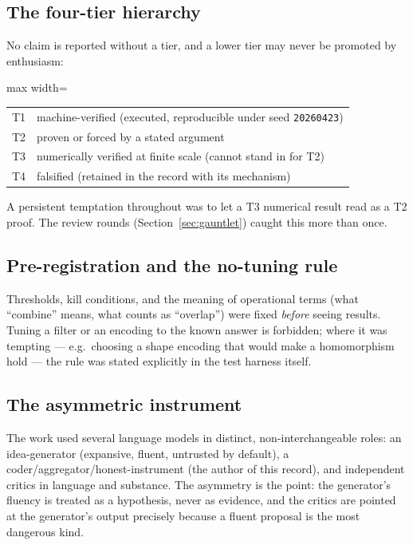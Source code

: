 \documentclass[11pt,a4paper]{article}
\newcommand{\seed}{\texttt{20260423}}
\newcommand{\TT}{\textsf{T1}}
\newcommand{\Tw}{\textsf{T2}}
\newcommand{\Th}{\textsf{T3}}
\newcommand{\Tf}{\textsf{T4}}
\theoremstyle{definition}
\theoremstyle{plain}
\begin{document}
\subsection{The four-tier hierarchy}
No claim is reported without a tier, and a lower tier may never be promoted by enthusiasm:
\begin{center}
\begin{adjustbox}{max width=\linewidth}\begin{tabular}{ll}
\toprule
\TT & machine-verified (executed, reproducible under seed \seed) \\
\Tw & proven or forced by a stated argument \\
\Th & numerically verified at finite scale (cannot stand in for \Tw) \\
\Tf & falsified (retained in the record with its mechanism) \\
\bottomrule
\end{tabular}\end{adjustbox}
\end{center}
A persistent temptation throughout was to let a \Th{} numerical result read as a \Tw{} proof. The
review rounds (Section~\ref{sec:gauntlet}) caught this more than once.

\subsection{Pre-registration and the no-tuning rule}
Thresholds, kill conditions, and the meaning of operational terms (what ``combine'' means, what
counts as ``overlap'') were fixed \emph{before} seeing results. Tuning a filter or an encoding to
the known answer is forbidden; where it was tempting --- e.g.\ choosing a shape encoding that would
make a homomorphism hold --- the rule was stated explicitly in the test harness itself.

\subsection{The asymmetric instrument}
The work used several language models in distinct, non-interchangeable roles: an idea-generator
(expansive, fluent, untrusted by default), a coder/aggregator/honest-instrument (the author of
this record), and independent critics in language and substance. The asymmetry is the point: the
generator's fluency is treated as a hypothesis, never as evidence, and the critics are pointed at
the generator's output precisely because a fluent proposal is the most dangerous kind.
\end{document}
